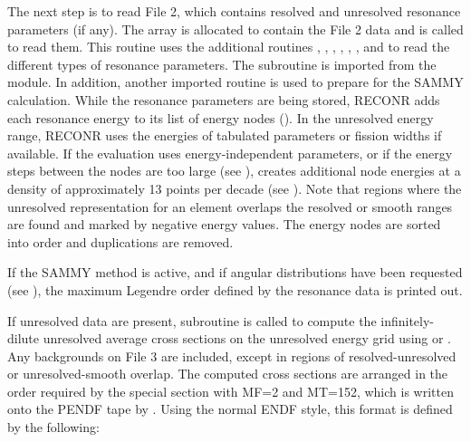 The next step is to read File 2, which contains resolved and
unresolved resonance parameters (if any).  The array 
is allocated to contain the File 2 data and
 is called to read
them.  This routine uses the additional routines
,
,
,
,
,
, and
 to read the
different types of resonance parameters.  The subroutine
 is imported from the
 module.  In
addition, another imported routine
 is used to
prepare for the SAMMY calculation.  While the resonance parameters
are being stored, RECONR  adds each resonance energy to its list
of energy nodes ().  In the unresolved energy range,
RECONR uses the energies of tabulated parameters or fission widths
if available.  If the evaluation uses energy-independent parameters,
or if the energy steps between the nodes are too large (see
),  creates
additional node energies at a density of approximately 13 points
per decade (see ).  Note that regions where the unresolved
representation for an element overlaps the resolved or smooth
ranges are found and marked by negative energy values.  The
energy nodes are sorted into order and duplications are removed.

If the SAMMY method is active, and if angular distributions
have been requested (see
),
the maximum
Legendre order defined by the resonance data is printed out.

If unresolved data are present, subroutine
 is called to compute
the infinitely-dilute unresolved average cross
sections on the unresolved energy grid using
 or
.  Any backgrounds
on File 3 are included, except in regions of resolved-unresolved
or unresolved-smooth overlap.  The computed cross sections are
arranged in the order required by the special section with
MF=2 and MT=152, which is written onto the PENDF
tape by .  Using the
normal ENDF style, this format is defined by the following:

